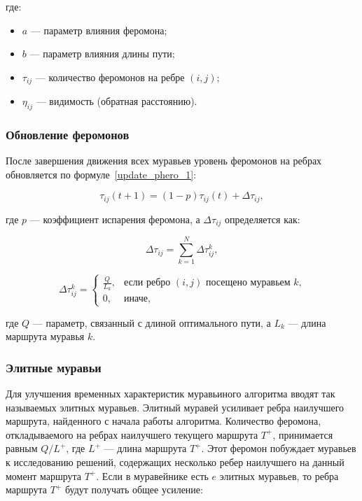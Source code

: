 где:
\begin{itemize}
    \item $a$ — параметр влияния феромона;
    \item $b$ — параметр влияния длины пути;
    \item $\tau_{ij}$ — количество феромонов на ребре $(i, j)$;
    \item $\eta_{ij}$ — видимость (обратная расстоянию).
\end{itemize}

\subsubsection*{Обновление феромонов}

После завершения движения всех муравьев уровень феромонов на ребрах обновляется по формуле~\eqref{update_phero_1}:

\begin{equation}
    \label{update_phero_1}
    \tau_{ij}(t+1) = (1-p)\tau_{ij}(t) + \Delta \tau_{ij},
\end{equation}

где $p$ — коэффициент испарения феромона, а $\Delta \tau_{ij}$ определяется как:

\begin{equation}
    \label{update_phero_2}
    \Delta \tau_{ij} = \sum_{k=1}^N \Delta \tau_{ij}^k,
\end{equation}

\begin{equation}
    \label{update_phero_3}
    \Delta \tau_{ij}^k = 
    \begin{cases}
        \frac{Q}{L_k}, & \text{если ребро $(i, j)$ посещено муравьем $k$,} \\
        0, & \text{иначе,}
    \end{cases}
\end{equation}

где $Q$ — параметр, связанный с длиной оптимального пути, а $L_k$ — длина маршрута муравья $k$.

\subsubsection*{Элитные муравьи}

Для улучшения временных характеристик муравьиного алгоритма вводят так называемых элитных муравьев. Элитный муравей усиливает ребра наилучшего маршрута, найденного с начала работы алгоритма. Количество феромона, откладываемого на ребрах наилучшего текущего маршрута $T^{+}$, принимается равным $Q / L^{+}$, где $L^{+}$ --- длина маршрута $T^{+}$. Этот феромон побуждает муравьев к исследованию решений, содержащих несколько ребер наилучшего на данный момент маршрута $T^{+}$. Если в муравейнике есть $e$ элитных муравьев, то ребра маршрута $T^{+}$ будут получать общее усиление:

